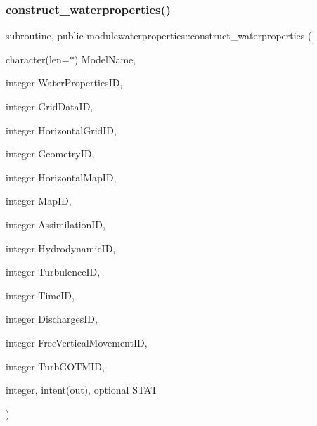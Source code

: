 \subsubsection{\texorpdfstring{construct\+\_\+waterproperties()}{construct\_waterproperties()}}
{\footnotesize\ttfamily subroutine, public modulewaterproperties\+::construct\+\_\+waterproperties (\begin{DoxyParamCaption}\item[{character(len=$\ast$)}]{Model\+Name,  }\item[{integer}]{Water\+Properties\+ID,  }\item[{integer}]{Grid\+Data\+ID,  }\item[{integer}]{Horizontal\+Grid\+ID,  }\item[{integer}]{Geometry\+ID,  }\item[{integer}]{Horizontal\+Map\+ID,  }\item[{integer}]{Map\+ID,  }\item[{integer}]{Assimilation\+ID,  }\item[{integer}]{Hydrodynamic\+ID,  }\item[{integer}]{Turbulence\+ID,  }\item[{integer}]{Time\+ID,  }\item[{integer}]{Discharges\+ID,  }\item[{integer}]{Free\+Vertical\+Movement\+ID,  }\item[{integer}]{Turb\+G\+O\+T\+M\+ID,  }\item[{integer, intent(out), optional}]{S\+T\+AT }\end{DoxyParamCaption})}

